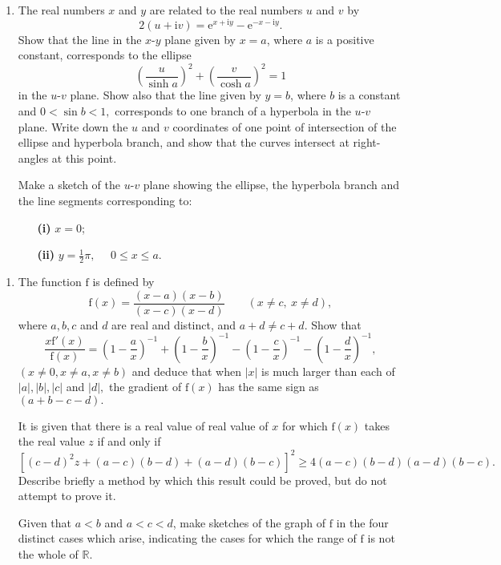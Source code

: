 \documentclass[a4, 11pt]{report}
\newlength{\qspace}
\newcounter{qnumber}
\newenvironment{question}%
 {\vspace{\qspace}
  \begin{enumerate}[\bfseries 1\quad][10]%
    \setcounter{enumi}{\value{qnumber}}%
    \item%
 }
{
  \end{enumerate}
  \filbreak
  \stepcounter{qnumber}
 }
\begin{document}
\begin{question}
	The real numbers $x$ and $y$ are related to the real numbers $u$
	and $v$ by 
	\[
	2(u+\mathrm{i}v)=\mathrm{e}^{x+\mathrm{i}y}-\mathrm{e}^{-x-\mathrm{i}y}.
	\]
	Show that the line in the $x$-$y$ plane given by $x=a$, where $a$
	is a positive constant, corresponds to the ellipse 
	\[
	\left(\frac{u}{\sinh a}\right)^{2}+\left(\frac{v}{\cosh a}\right)^{2}=1
	\]
	in the $u$-$v$ plane. Show also that the line given by $y=b$, where
	$b$ is a constant and $0<\sin b<1,$ corresponds to one branch of
	a hyperbola in the $u$-$v$ plane. Write down the $u$ and $v$ coordinates
	of one point of intersection of the ellipse and hyperbola branch,
	and show that the curves intersect at right-angles at this point. 


	Make a sketch of the $u$-$v$ plane showing the ellipse, the hyperbola
	branch and the line segments corresponding to: 
\begin{itemize}
\setlength{\itemsep}{3mm}
\item[\bf (i)] $x=0$; 
\item[\bf (ii)] $y=\frac{1}{2}\pi,$ $\quad 0\leqslant x\leqslant a.$ 
\end{itemize}
\end{question}


\begin{question}
The function $\mathrm{f}$ is defined by 
\[
\mathrm{f}(x)=\frac{\left(x-a\right)\left(x-b\right)}{\left(x-c\right)\left(x-d\right)}\qquad\left(x\neq c,\ x\neq d\right),
\]
where $a,b,c$ and $d$ are real and distinct, and $a+d\neq c+d$.
Show that 
\[
\frac{x\mathrm{f}'(x)}{\mathrm{f}(x)}=\left(1-\frac{a}{x}\right)^{-1}+\left(1-\frac{b}{x}\right)^{-1}-\left(1-\frac{c}{x}\right)^{-1}-\left(1-\frac{d}{x}\right)^{-1},
\]
$(x\neq0,x\neq a,x\neq b)$ and deduce that when $\left|x\right|$
is much larger than each of $\left|a\right|,\left|b\right|,\left|c\right|$
and $\left|d\right|,$ the gradient of $\mathrm{f}(x)$ has the same
sign as $(a+b-c-d).$ 


It is given that there is a real value of real value of $x$ for which
$\mathrm{f}(x)$ takes the real value $z$ if and only if 
\[
[\left(c-d\right)^{2}z+\left(a-c\right)\left(b-d\right)+\left(a-d\right)\left(b-c\right)]^{2}\geqslant4\left(a-c\right)\left(b-d\right)\left(a-d\right)\left(b-c\right).
\]
Describe briefly a method by which this result could be proved, but
do not attempt to prove \nolinebreak it. 


Given that $a<b$ and $a<c<d$, make sketches of the graph of $\mathrm{f}$
in the four distinct cases which arise, indicating the cases for which
the range of $\mathrm{f}$ is not the whole of $\mathbb{R}.$ 
\end{question}
\end{document}
